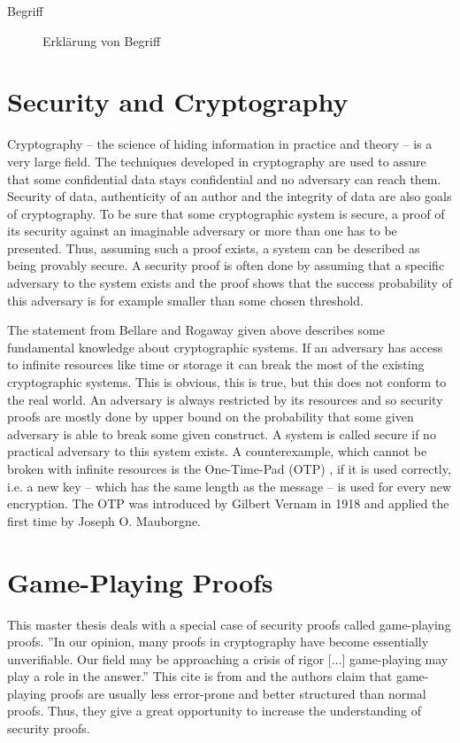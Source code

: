 \begin{description}
	\item[Begriff] Erklärung von Begriff
\end{description}

\section*{Security and Cryptography}
Cryptography -- the science of hiding information in practice and theory -- is a very large field. The techniques developed in cryptography
are used to assure that some confidential data stays confidential and no adversary can reach them. Security of data, authenticity of an author
and the integrity of data are also goals of cryptography. To be sure that some cryptographic system is secure, a proof of its security against
an imaginable adversary or more than one has to be presented. Thus, assuming such a proof exists, a system can be described as being provably secure.
A security proof is often done by assuming that a specific adversary to the system exists and the proof shows that the success probability of
this adversary is for example smaller than some chosen threshold.

The statement from Bellare and Rogaway given above describes some fundamental knowledge about cryptographic systems. If an adversary has access to
infinite resources like time or storage it can break the most of the existing cryptographic systems. This is obvious, this is true, but this does not conform to
the real world. An adversary is always restricted by its resources and so security proofs are mostly done by upper bound on the probability that some given
adversary is able to break some given construct. A system is called secure if no practical adversary to this system exists.
A counterexample, which cannot be broken with infinite resources is the One-Time-Pad (OTP) \cite{DBLP:books/sp/voecking2011/Tantau11}, if it is used correctly,
i.e. a new key -- which has the same length as the message -- is used for every new encryption.
The OTP was introduced by Gilbert Vernam in 1918 and applied the first time by Joseph O. Mauborgne.

\section*{Game-Playing Proofs}
This master thesis deals with a special case of security proofs called game-playing proofs. ''In our opinion, many proofs in cryptography have become
essentially unverifiable. Our field may be approaching a crisis of rigor [$\hdots$] game-playing may play a role in the answer.''
This cite is from \cite{DBLP:conf/eurocrypt/BellareR06} and the authors claim that game-playing proofs are usually less error-prone and better structured
than normal proofs. Thus, they give a great opportunity to increase the understanding of security proofs.

